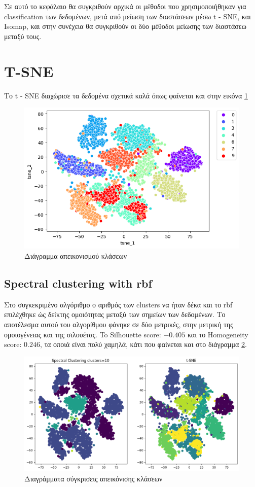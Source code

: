 Σε αυτό το κεφάλαιο θα συγκριθούν αρχικά οι μέθοδοι που χρησιμοποιήθηκαν για classification των δεδομένων, μετά από μείωση των διαστάσεων μέσω t - SNE, και Isomap, και στην συνέχεια
θα συγκριθούν οι δύο μέθοδοι μείωσης των διαστάσεω μεταξύ τους.
\section{T-SNE}
Το t - SNE διαχώρισε τα δεδομένα σχετικά καλά όπως φαίνεται και στην εικόνα \ref{f:g1}
\begin{figure}[ht]
	\centering
	\includegraphics[width=1\linewidth]{Imagedata1/tsne.png}
	\caption{ Διάγραμμα απεικονισμού κλάσεων }
	\label{f:g1}	
\end{figure}

\clearpage

\subsection{Spectral clustering with rbf}

Στο συγκεκριμένο αλγόριθμο ο αριθμός των clusters να ήταν δέκα και το rbf επιλέχθηκε ώς δείκτης ομοιότητας μεταξύ των σημείων των δεδομένων.
Το αποτέλεσμα αυτού του αλγορίθμου φάνηκε σε δύο μετρικές, στην μετρική της ομοιογένειας και της σιλουέτας. To Silhouette score: $-0.405$ και το Homogeneity score: $0.246$, τα οποιά είναι πολύ χαμηλά, κάτι που φαίνεται και στο διάγραμμα \ref{f:g2}.

\begin{figure}[ht]
	\centering
	\includegraphics[width=1\linewidth]{Imagedata1/rbftsne.png}
	\caption{ Διαγράμματα σύγκρισεις απεικόνισης κλάσεων }
	\label{f:g2}	
\end{figure}

